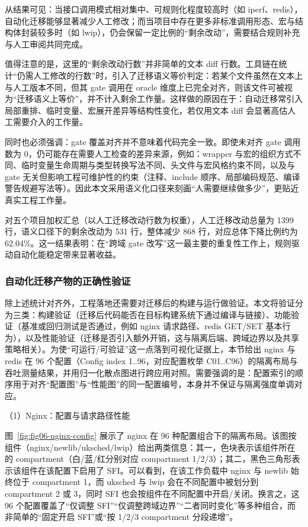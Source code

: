 \documentclass[UTF8,a4paper,12pt,twoside]{ctexart}  %
\begin{document}
从结果可见：当接口调用模式相对集中、可规则化程度较高时（如
iperf、redis），自动化迁移能够显著减少人工修改；而当项目中存在更多非标准调用形态、宏与结构体封装较多时（如
lwip），仍会保留一定比例的``剩余改动''，需要结合规则补充与人工审阅共同完成。

值得注意的是，这里的``剩余改动行数''并非简单的文本 diff
行数。工具链在统计``仍需人工修改的行数''时，引入了迁移语义等价判定：若某个文件虽然在文本上与人工版本不同，但其
gate 调用在 oracle
维度上已完全对齐，则该文件可被视为``迁移语义上等价''，并不计入剩余工作量。这样做的原因在于：自动迁移常引入局部重排、临时变量、宏展开差异等结构性变化，若仅用文本
diff 会显著高估人工需要介入的工作量。

同时也必须强调：gate 覆盖对齐并不意味着代码完全一致。即使未对齐 gate
调用数为 0，仍可能存在需要人工检查的差异来源，例如：wrapper
与宏的组织方式不同、临时变量生命周期与类型转换写法不同、头文件与宏风格约束不同，以及与
gate 无关但影响工程可维护性的约束（注释、include
顺序、局部编码规范、编译警告规避写法等）。因此本文采用语义化口径来刻画``人需要继续做多少''，更贴近真实工程工作量。

对五个项目加权汇总（以人工迁移改动行数为权重），人工迁移改动总量为 1399
行，语义口径下的剩余改动为 531 行，整体减少 868 行，对应总体下降比例约为
62.04\%。这一结果表明：在``跨域 gate
改写''这一最主要的重复性工作上，规则驱动自动化能稳定带来显著收益。

\subsubsection{自动化迁移产物的正确性验证}

除上述统计对齐外，工程落地还需要对迁移后的构建与运行做验证。本文将验证分为三类：构建验证（迁移后代码能否在目标构建系统下通过编译与链接）、功能验证（基准或回归测试是否通过，例如 nginx 请求路径、redis GET/SET 基本行为），以及性能验证（迁移是否引入额外开销，这与隔离后端、跨域边界以及共享策略相关）。为使“可运行/可验证”这一点落到可视化证据上，本节给出 nginx 与 redis 在 96 个配置（Config index 1..96，对应配置枚举 C01..C96）的隔离布局与吞吐测量结果，并用归一化散点图进行跨应用对照。需要强调的是：配置索引的顺序用于对齐“配置图”与“性能图”的同一配置编号，本身并不保证与隔离强度单调对应。

（1）Nginx：配置与请求路径性能

图~\ref{fig:fig06-nginx-config} 展示了 nginx 在 96 种配置组合下的隔离布局。该图按组件（nginx/newlib/uksched/lwip）给出两类信息：其一，色块表示该组件所在的 compartment（白/蓝/红分别对应 compartment 1/2/3）；其二，黑色三角形表示该组件在该配置下启用了 SFI。可以看到，在该工作负载中 nginx 与 newlib 始终位于 compartment 1，而 uksched 与 lwip 会在不同配置中被划分到 compartment 2 或 3，同时 SFI 也会按组件在不同配置中开启/关闭。换言之，这 96 个配置覆盖了“仅调整 SFI”“仅调整跨域边界”“二者同时变化”等多种组合，而非简单的“固定开启 SFI”或“按 1/2/3 compartment 分段递增”。
\end{document}
